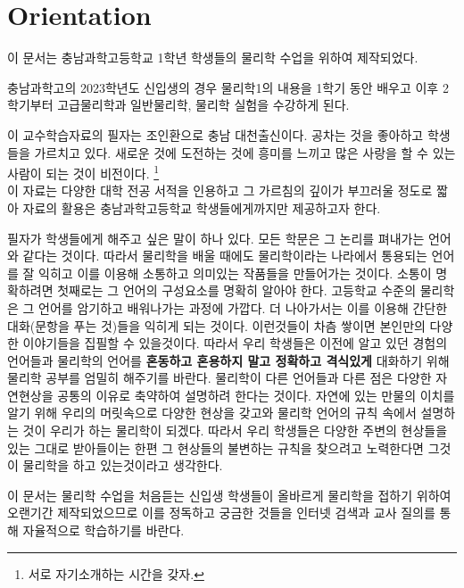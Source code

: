 \documentclass[article,chapter,openany,amsmath,gremph,lwarp]{oblivoir}
\begin{document}
\section{Orientation} 
\begin{flushleft}


이 문서는 충남과학고등학교 1학년 학생들의 물리학 수업을 위하여 제작되었다.

충남과학고의 2023학년도 신입생의 경우 물리학1의 내용을 1학기 동안 배우고 이후 2학기부터 고급물리학과 일반물리학, 물리학 실험을 
수강하게 된다. 

이 교수학습자료의 필자는 조인환으로 충남 대천출신이다. 공차는 것을 좋아하고 학생들을 가르치고 있다. 새로운 것에 도전하는 것에 흥미를 느끼고 
많은 사랑을 할 수 있는 사람이 되는 것이 비전이다. \footnote{서로 자기소개하는 시간을 갖자.}\\
이 자료는 다양한 대학 전공 서적을 인용하고 그 가르침의 깊이가 부끄러울 정도로 짧아 자료의 활용은 충남과학고등학교 학생들에게까지만 제공하고자 한다.
\\

필자가 학생들에게 해주고 싶은 말이 하나 있다. 모든 학문은 그 논리를 펴내가는 언어와 같다는 것이다. 
따라서 물리학을 배울 때에도 물리학이라는 나라에서 통용되는 언어를 잘 익히고 이를 이용해 소통하고 의미있는 작품들을 만들어가는 것이다. 
소통이 명확하려면 첫째로는 그 언어의 구성요소를 명확히 알아야 한다. 고등학교 수준의 물리학은 그 언어를 암기하고 배워나가는 과정에
가깝다. 더 나아가서는 이를 이용해 간단한 대화(문항을 푸는 것)들을 익히게 되는 것이다. 
이런것들이 차츰 쌓이면 본인만의 다양한 이야기들을 집필할 수 있을것이다. 
따라서 우리 학생들은 이전에 알고 있던 경험의 언어들과 물리학의 언어를 \textbf{혼동하고 혼용하지 말고 정확하고 격식있게} 대화하기 위해
물리학 공부를 엄밀히 해주기를 바란다.  
물리학이 다른 언어들과 다른 점은 다양한 자연현상을 공통의 이유로 축약하여 설명하려 한다는 것이다. 
자연에 있는 만물의 이치를 알기 위해 우리의 머릿속으로 다양한 현상을 갖고와 물리학 언어의 규칙 속에서
설명하는 것이 우리가 하는 물리학이 되겠다. 따라서 우리 학생들은 다양한 주변의 현상들을 있는 그대로 받아들이는 한편 그 현상들의 
불변하는 규칙을 찾으려고 노력한다면 그것이 물리학을 하고 있는것이라고 생각한다.


이 문서는 물리학 수업을 처음듣는 신입생 학생들이 올바르게 물리학을 접하기 위하여 오랜기간 제작되었으므로 이를 정독하고 
궁금한 것들을 인터넷 검색과 교사 질의를 통해 자율적으로 학습하기를 바란다.



\end{flushleft}
\end{document}
